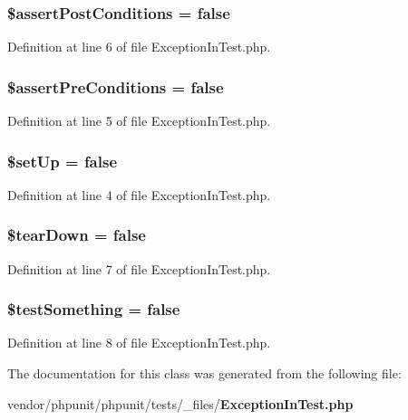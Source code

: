 \subsubsection[{\$assert\+Post\+Conditions}]{\setlength{\rightskip}{0pt plus 5cm}\${\bf assert\+Post\+Conditions} = false}\label{class_exception_in_test_ae16868ae0cb9f100fb80bf4987de5a85}


Definition at line 6 of file Exception\+In\+Test.\+php.

\subsubsection[{\$assert\+Pre\+Conditions}]{\setlength{\rightskip}{0pt plus 5cm}\${\bf assert\+Pre\+Conditions} = false}\label{class_exception_in_test_af1c82be5eeeef75035a066c7cc2eb172}


Definition at line 5 of file Exception\+In\+Test.\+php.

\subsubsection[{\$set\+Up}]{\setlength{\rightskip}{0pt plus 5cm}\${\bf set\+Up} = false}\label{class_exception_in_test_aed7dec37f7cfd2a33216b3f81ebaeb8e}


Definition at line 4 of file Exception\+In\+Test.\+php.

\subsubsection[{\$tear\+Down}]{\setlength{\rightskip}{0pt plus 5cm}\${\bf tear\+Down} = false}\label{class_exception_in_test_a9639b8e6f680299142ffe313f876712f}


Definition at line 7 of file Exception\+In\+Test.\+php.

\subsubsection[{\$test\+Something}]{\setlength{\rightskip}{0pt plus 5cm}\${\bf test\+Something} = false}\label{class_exception_in_test_a25acbdb5bf8dc30b31f537d60bfb02f5}


Definition at line 8 of file Exception\+In\+Test.\+php.



The documentation for this class was generated from the following file\+:\begin{DoxyCompactItemize}
\item 
vendor/phpunit/phpunit/tests/\+\_\+files/{\bf Exception\+In\+Test.\+php}\end{DoxyCompactItemize}
